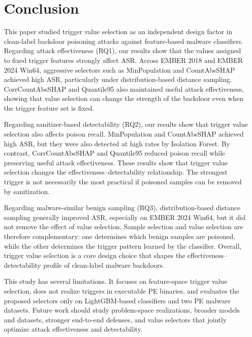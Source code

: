 \section{Conclusion}
This paper studied trigger value selection as an independent design factor in clean-label backdoor poisoning attacks against feature-based malware classifiers.
Regarding attack effectiveness (RQ1), our results show that the values assigned to fixed trigger features strongly affect ASR.
Across EMBER 2018 and EMBER 2024 Win64, aggressive selectors such as MinPopulation and CountAbsSHAP achieved high ASR, particularly under distribution-based distance sampling.
CorrCountAbsSHAP and Quantile95 also maintained useful attack effectiveness, showing that value selection can change the strength of the backdoor even when the trigger feature set is fixed.

Regarding sanitizer-based detectability (RQ2), our results show that trigger value selection also affects poison recall.
MinPopulation and CountAbsSHAP achieved high ASR, but they were also detected at high rates by Isolation Forest. By contrast, CorrCountAbsSHAP and Quantile95 reduced poison recall while preserving useful attack effectiveness.
These results show that trigger value selection changes the effectiveness--detectability relationship.
The strongest trigger is not necessarily the most practical if poisoned samples can be removed by sanitization.

Regarding malware-similar benign sampling (RQ3), distribution-based distance sampling generally improved ASR, especially on EMBER 2024 Win64, but it did not remove the effect of value selection. 
Sample selection and value selection are therefore complementary: one determines which benign samples are poisoned, while the other determines the trigger pattern learned by the classifier. 
Overall, trigger value selection is a core design choice that shapes the effectiveness--detectability profile of clean-label malware backdoors.

This study has several limitations. It focuses on feature-space trigger value selection, does not realize triggers in executable PE binaries, and evaluates the proposed selectors only on LightGBM-based classifiers and two PE malware datasets.
Future work should study problem-space realizations, broader models and datasets, stronger end-to-end defenses, and value selectors that jointly optimize attack effectiveness and detectability.
